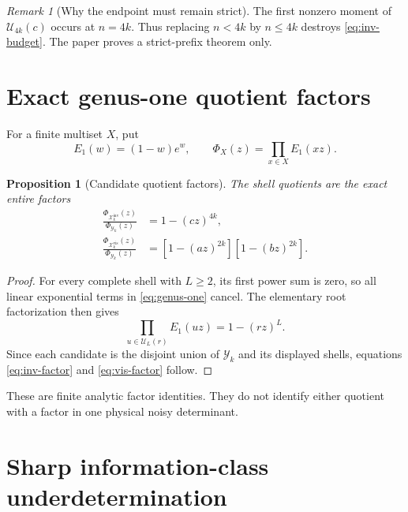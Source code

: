 \documentclass[11pt]{article}
\newtheorem{proposition}[theorem]{Proposition}
\theoremstyle{remark}
\newtheorem{remark}[theorem]{Remark}
\newcommand{\cU}{\mathcal U}
\newcommand{\cY}{\mathcal Y}
\newcommand{\cX}{\mathcal X}
\newcommand{\inv}{\mathrm{inv}}
\newcommand{\vis}{\mathrm{vis}}
\begin{document}
\begin{remark}[Why the endpoint must remain strict]
The first nonzero moment of $\cU_{4k}(c)$ occurs at $n=4k$.  Thus replacing
$n<4k$ by $n\le4k$ destroys \eqref{eq:inv-budget}.  The paper proves a
strict-prefix theorem only.
\end{remark}

\section{Exact genus-one quotient factors}

For a finite multiset $X$, put
\begin{equation}\label{eq:genus-one}
 E_1(w)=(1-w)e^w,
 \qquad \Phi_X(z)=\prod_{x\in X}E_1(xz).
\end{equation}

\begin{proposition}[Candidate quotient factors]
\label{prop:quotient-factors}
The shell quotients are the exact entire factors
\begin{align}
 \frac{\Phi_{\cX_k^{\inv}}(z)}{\Phi_{\cY_k}(z)}
 &=1-(cz)^{4k},
 \label{eq:inv-factor}\\
 \frac{\Phi_{\cX_k^{\vis}}(z)}{\Phi_{\cY_k}(z)}
 &=[1-(az)^{2k}][1-(bz)^{2k}].
 \label{eq:vis-factor}
\end{align}
\end{proposition}

\begin{proof}
For every complete shell with $L\ge2$, its first power sum is zero, so all
linear exponential terms in \eqref{eq:genus-one} cancel.  The elementary
root factorization then gives
\begin{equation}\label{eq:shell-factor}
 \prod_{u\in\cU_L(r)}E_1(uz)=1-(rz)^L.
\end{equation}
Since each candidate is the disjoint union of $\cY_k$ and its displayed
shells, equations \eqref{eq:inv-factor} and \eqref{eq:vis-factor} follow.
\end{proof}

These are finite analytic factor identities.  They do not identify either
quotient with a factor in one physical noisy determinant.

\section{Sharp information-class underdetermination}
\end{document}
